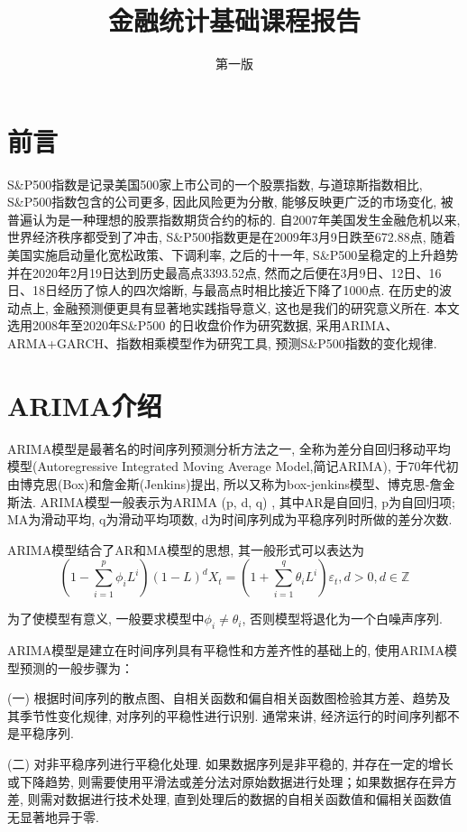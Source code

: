 \documentclass[12pt]{article}
\title{金融统计基础课程报告}
\author{第一版}
\begin{document}
% 
\maketitle
\tableofcontents


\newpage
\section{前言}
\qquad S\&P500指数是记录美国500家上市公司的一个股票指数, 与道琼斯指数相比, S\&P500指数包含的公司更多, 因此风险更为分散, 能够反映更广泛的市场变化, 被普遍认为是一种理想的股票指数期货合约的标的. 自2007年美国发生金融危机以来, 世界经济秩序都受到了冲击, S\&P500指数更是在2009年3月9日跌至672.88点, 随着美国实施启动量化宽松政策、下调利率, 之后的十一年, S\&P500呈稳定的上升趋势并在2020年2月19日达到历史最高点3393.52点, 然而之后便在3月9日、12日、16日、18日经历了惊人的四次熔断, 与最高点时相比接近下降了1000点. 在历史的波动点上, 金融预测便更具有显著地实践指导意义, 这也是我们的研究意义所在. 本文选用2008年至2020年S\&P500 的日收盘价作为研究数据, 采用ARIMA、ARMA+GARCH、指数相乘模型作为研究工具, 预测S\&P500指数的变化规律. 

\section{ARIMA介绍}

\qquad ARIMA模型是最著名的时间序列预测分析方法之一, 全称为差分自回归移动平均模型(Autoregressive Integrated Moving Average Model,简记ARIMA), 于70年代初由博克思(Box)和詹金斯(Jenkins)提出, 所以又称为box-jenkins模型、博克思-詹金斯法. ARIMA模型一般表示为ARIMA (p, d, q) , 其中AR是自回归, p为自回归项; MA为滑动平均, q为滑动平均项数, d为时间序列成为平稳序列时所做的差分次数. 

\qquad ARIMA模型结合了AR和MA模型的思想, 其一般形式可以表达为
\[
(1-\sum_{i=1}^p \phi_i L^i)(1-L)^d X_t = (1+\sum_{i=1}^q \theta_i L^i)\varepsilon_t,d>0,d \in \mathbb{Z}
\]

为了使模型有意义, 一般要求模型中$\phi_i \ne \theta_i$, 否则模型将退化为一个白噪声序列. 

\qquad ARIMA模型是建立在时间序列具有平稳性和方差齐性的基础上的, 使用ARIMA模型预测的一般步骤为：

\qquad  (一) 根据时间序列的散点图、自相关函数和偏自相关函数图检验其方差、趋势及其季节性变化规律, 对序列的平稳性进行识别. 通常来讲,  经济运行的时间序列都不是平稳序列. 

\qquad  (二) 对非平稳序列进行平稳化处理. 如果数据序列是非平稳的, 并存在一定的增长或下降趋势, 则需要使用平滑法或差分法对原始数据进行处理；如果数据存在异方差, 则需对数据进行技术处理, 直到处理后的数据的自相关函数值和偏相关函数值无显著地异于零. 
\end{document}
